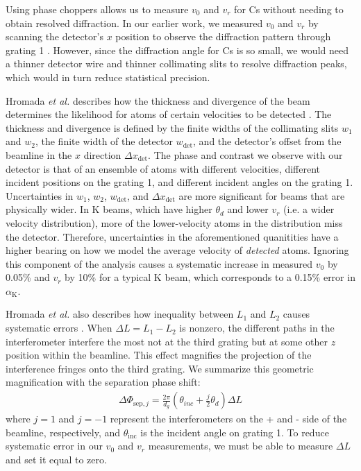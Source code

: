 \documentclass[twocolumn,prl,showpacs,superscriptaddress]{revtex4-1}   %
\newcommand{\ak}{\alpha_{\textrm{K}}}
\newcommand{\dphisepj}{\Delta\Phi_{\mathrm{sep},j}}
\newcommand{\etalspace}{\textit{et al. }}
\begin{document}
Using phase choppers allows us to measure $v_0$ and $v_r$ for Cs without needing to obtain resolved diffraction. In our earlier work, we measured $v_0$ and $v_r$ by scanning the detector's $x$ position to observe the diffraction pattern through grating 1 \cite{Holmgren2010}. However, since the diffraction angle for Cs is so small, we would need a thinner detector wire and thinner collimating slits to resolve diffraction peaks, which would in turn reduce statistical precision.

Hromada \etalspace describes how the thickness and divergence of the beam determines the likelihood for atoms of certain velocities to be detected \cite{Hromada2014}.
The thickness and divergence is defined by the finite widths of the collimating slits $w_1$ and $w_2$, the finite width of the detector $w_{\mathrm{det}}$, and the detector's offset from the beamline in the $x$ direction $\Delta x_{\mathrm{det}}$.
The phase and contrast we observe with our detector is that of an ensemble of atoms with different velocities, different incident positions on the grating 1, and different incident angles on the grating 1.
Uncertainties in $w_1$, $w_2$, $w_{\mathrm{det}}$, and $\Delta x_{\mathrm{det}}$ are more significant for beams that are physically wider. 
In K beams, which have higher $\theta_d$ and lower $v_r$ (i.e. a wider velocity distribution), more of the lower-velocity atoms in the distribution miss the detector. Therefore, uncertainties in the aforementioned quanitities have a higher bearing on how we model the average velocity of \textit{detected} atoms.
Ignoring this component of the analysis causes a systematic increase in measured $v_0$ by 0.05\% and $v_r$ by 10\% for a typical K beam, which corresponds to a 0.15\% error in $\ak$.

Hromada \etalspace also describes how inequality between $L_1$ and $L_2$ causes systematic errors \cite{Hromada2014}. 
When $\Delta L = L_1 - L_2$ is nonzero, the different paths in the interferometer interfere the most not at the third grating but at some other $z$ position within the beamline.
This effect magnifies the projection of the interference fringes onto the third grating. We summarize this geometric magnification with the separation phase shift:
\begin{align}
	\dphisepj = \frac{2\pi}{d_g}
	\left(
		\theta_{inc} + \frac{j}{2}\theta_d
	\right) \Delta L
	\label{phiSep}
\end{align}
where $j=1$ and $j=-1$ represent the interferometers on the + and - side of the beamline, respectively, and $\theta_{\mathrm{inc}}$ is the incident angle on grating 1. 
To reduce systematic error in our $v_0$ and $v_r$ measurements, 
we must be able to measure $\Delta L$ and set it equal to zero.
\end{document}
